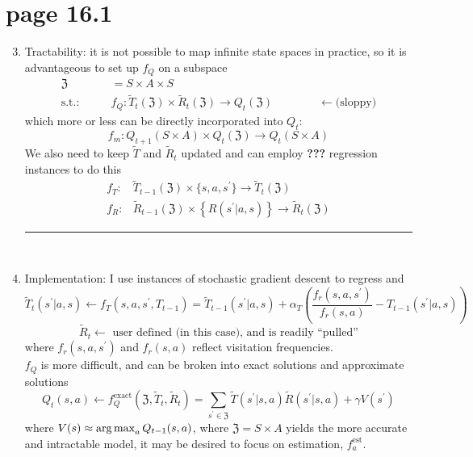 \section*{page 16.1}

\begin{enumerate}[label=\protect\circled{\arabic*}]
\setcounter{enumi}{2}
\item Tractability: it is not possible to map infinite state spaces in practice, so it is advantageous to set up $f_Q$ on a 
subspace \begin{align*}
\mathfrak{Z} & = S \times A \times S \\
\text{s.t.:}\qquad & f_Q: \tilde{T}_t( \mathfrak{Z} ) \times \tilde{R}_t ( \mathfrak{Z} ) \rightarrow Q_t( \mathfrak{Z} )\qquad\qquad \leftarrow\text{(sloppy)}
\end{align*}
which more or less can be directly incorporated into $Q_t$:
\begin{equation*}
f_m: Q_{t+1}( S \times A ) \times Q_t(\mathfrak{Z}) \rightarrow Q_t(S\times A)
\end{equation*}
We also need to keep $\tilde{T}$ and $\tilde{R}_t$ updated and can employ \textbf{???} regression instances to do this
\begin{align*}
f_T: & \tilde{T}_{t-1}(\mathfrak{Z})\times\{s,a,s^\prime\}\rightarrow \tilde{T}_t(\mathfrak{Z}) \\
f_R: & \tilde{R}_{t-1}( \mathfrak{Z} ) \times \left\{  R( s^\prime | a, s ) \right\} \rightarrow \tilde{R}_t( \mathfrak{Z} )
\end{align*}
\hrule
{\ }\\

\item Implementation: I use instances of stochastic gradient descent to regress  and 
\begin{equation*}
\tilde{T}_t(s^\prime | a, s ) \leftarrow f_T(s,a,s^\prime,T_{t-1}) = \tilde{T}_{t-1}(s^\prime|a,s)+\alpha_T\left(\frac{f_r(s,a,s^\prime)}{f_r(s,a)}-T_{t-1}(s^\prime|a,s)\right)
\end{equation*}
\begin{equation*}
\tilde{R}_t \leftarrow\text{\ user defined (in this case), and is readily ``pulled''}
\end{equation*}
where $f_r(s,a,s^\prime)$ and $f_r(s,a)$ reflect visitation frequencies.\\

$f_Q$ is more difficult, and can be broken into exact solutions and approximate solutions
\begin{equation*}
Q_t(s,a) \leftarrow f_Q^{\text{exact}}\left( \mathfrak{Z}, \tilde{T}_t, \tilde{R}_t \right) = \sum_{s^\prime \in \mathfrak{Z}} \tilde{T}(s^\prime|s,a) \tilde{R}(s^\prime|s,a) +\gamma V(s^\prime)
\end{equation*}
where $V(s)\approx \operatorname*{arg\,max}_{a} Q_{t-1}(s,a)$, where $\mathfrak{Z}=S \times A$ yields the more accurate and intractable model, it may be desired to focus on estimation, $f_a^{\text{est}}$.

\end{enumerate}